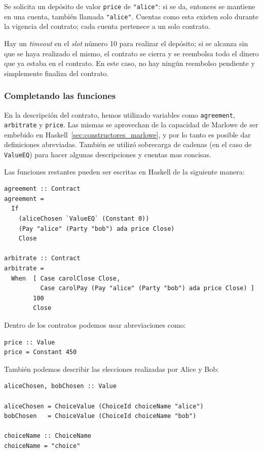 \documentclass[12pt]{book}
\begin{document}
Se solicita un depósito de valor \texttt{price} de \texttt{"{}alice"{}}: si se da, entonces se mantiene en una cuenta, también llamada \texttt{"{}alice"{}}. Cuentas como esta existen solo durante la vigencia del contrato; cada cuenta pertenece a un solo contrato. %

Hay un \textit{timeout} en el \textit{slot} número 10 para realizar el depósito; si se alcanza sin que se haya realizado el mismo, el contrato se cierra y se reembolsa todo el dinero que ya estaba en el contrato. En este caso, no hay ningún reembolso pendiente y simplemente finaliza del contrato.

\subsubsection{Completando las funciones}
En la descripción del contrato, hemos utilizado variables como \texttt{agreement}, \texttt{arbitrate} y \texttt{price}. Las mismas se aprovechan de la capacidad de Marlowe de ser embebido en Haskell~\ref{sec:constructores_marlowe}, y por lo tanto es posible dar definiciones abreviadas. También se utilizó sobrecarga de cadenas (en el caso de \texttt{ValueEQ}) para hacer algunas descripciones y cuentas mas concisas.

Las funciones restantes pueden ser escritas en Haskell de la siguiente manera:

\begin{lstlisting}[style=Haskell-cardano, language=Marlowe, caption=Funciones \texttt{agreement} y \texttt{arbitrate}.]
agreement :: Contract
agreement =
  If
    (aliceChosen `ValueEQ` (Constant 0))
    (Pay "alice" (Party "bob") ada price Close)
    Close

arbitrate :: Contract
arbitrate =
  When  [ Case carolClose Close,
          Case carolPay (Pay "alice" (Party "bob") ada price Close) ]
        100
        Close
\end{lstlisting}

Dentro de los contratos podemos usar abreviaciones como:

\begin{lstlisting}[style=Haskell-cardano, language=Marlowe, caption=Funcion \texttt{price}.]
price :: Value
price = Constant 450
\end{lstlisting}


También podemos describir las elecciones realizadas por Alice y Bob:

\begin{lstlisting}[style=Haskell-cardano, language=Marlowe, caption=Definicion de las elecciones.]
aliceChosen, bobChosen :: Value

aliceChosen = ChoiceValue (ChoiceId choiceName "alice")
bobChosen   = ChoiceValue (ChoiceId choiceName "bob")

choiceName :: ChoiceName
choiceName = "choice"
\end{lstlisting}
\end{document}
